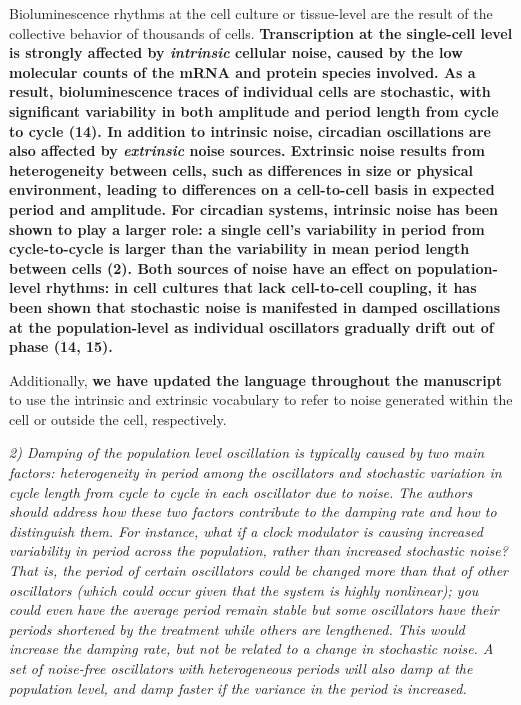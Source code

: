 \documentclass[11pt, letterpaper]{article}
\newenvironment{reviewer}{\itshape\color{gray}}{}
\newenvironment{manuscript}[1]{\begin{center}\begin{tcolorbox}[colback=green!5!white,colframe=green!75!black,width=\textwidth,title={#1},breakable,fonttitle=\bfseries]}{\end{tcolorbox}\end{center}}
\begin{document}
\begin{manuscript}{Page 3}
Bioluminescence rhythms at the cell culture or tissue-level are the result of the collective behavior of thousands of cells. 
{\bfseries
  Transcription at the single-cell level is strongly affected by {\itshape intrinsic} cellular noise, caused by the low molecular counts of the mRNA and protein species involved. As a result, bioluminescence traces of individual cells are stochastic, with significant variability in both amplitude and period length from cycle to cycle (14). In addition to intrinsic noise, circadian oscillations are also affected by {\itshape extrinsic} noise sources. Extrinsic noise results from heterogeneity between cells, such as differences in size or physical environment, leading to differences on a cell-to-cell basis in expected period and amplitude. For circadian systems, intrinsic noise has been shown to play a larger role: a single cell's variability in period from cycle-to-cycle is larger than the variability in mean period length between cells (2). Both sources of noise have an effect on population-level rhythms: in cell cultures that lack cell-to-cell coupling, it has been shown that stochastic noise is manifested in damped oscillations at the population-level as individual oscillators gradually drift out of phase (14, 15).
}
\end{manuscript}

Additionally, {\bfseries we have updated the language throughout the manuscript} to use the intrinsic and extrinsic vocabulary to refer to noise generated within the cell or outside the cell, respectively.

\begin{reviewer}
2) Damping of the population level oscillation is typically caused by two main factors: heterogeneity in period among the oscillators and stochastic variation in cycle length from cycle to cycle in each oscillator due to noise. 
The authors should address how these two factors contribute to the damping rate and how to distinguish them. 
For instance, what if a clock modulator is causing increased variability in period across the population, rather than increased stochastic noise? That is, the period of certain oscillators could be changed more than that of other oscillators (which could occur given that the system is highly nonlinear); you could even have the average period remain stable but some oscillators have their periods shortened by the treatment while others are lengthened. 
This would increase the damping rate, but not be related to a change in stochastic noise. 
A set of noise-free oscillators with heterogeneous periods will also damp at the population level, and damp faster if the variance in the period is increased.
\end{reviewer}
\end{document}
